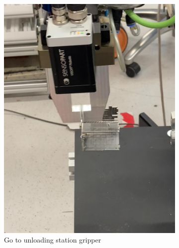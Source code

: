 \begin{figure}[h]
    \centering
    \begin{subfigure}[b]{0.32\textwidth}
        \centering
        \includegraphics[width=\textwidth]{figures/sheet-pickup/sheet-placement01.png}
        \caption{Go to unloading station gripper}
        \label{subfig:sheet-placement01}
    \end{subfigure}\hspace{0.1cm}
    \begin{subfigure}[b]{0.32\textwidth}
        \centering

\end{subfigure}
\end{figure}

